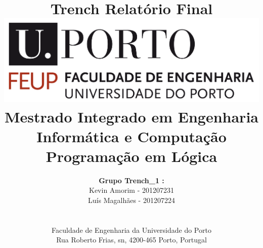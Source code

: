 \title{\Huge\textbf{Trench}\linebreak\linebreak\linebreak
\Large\textbf{Relatório Final}\linebreak\linebreak
\linebreak\linebreak
\includegraphics[scale=0.1]{img/feup-logo.png}\linebreak\linebreak
\linebreak\linebreak
\Large{Mestrado Integrado em Engenharia Informática e Computação} \linebreak\linebreak
\Large{Programação em Lógica}\linebreak
}

\author{\textbf{Grupo Trench\_1 :}\\
Kevin Amorim - 201207231 \\
Luís Magalhães - 201207224 \\
\linebreak\linebreak \\
 \\ Faculdade de Engenharia da Universidade do Porto \\ Rua Roberto Frias, s\/n, 4200-465 Porto, Portugal \linebreak\linebreak\linebreak
\linebreak\linebreak\vspace{1cm}}

\maketitle
\thispagestyle{empty}

\newpage


